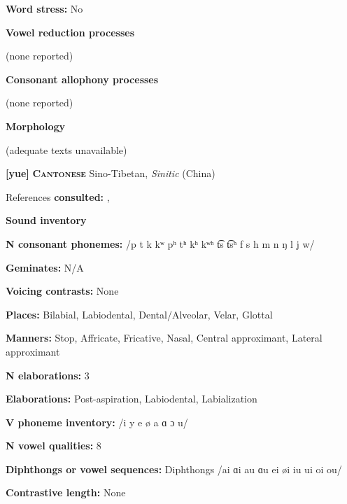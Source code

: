 \textbf{Word stress:} No



\textbf{Vowel reduction processes}



(none reported)



\textbf{Consonant allophony processes}



(none reported) 



\textbf{Morphology}



(adequate texts unavailable)



\textbf{[yue]}   \textbf{\textsc{Cantonese}}  Sino-Tibetan, \textit{Sinitic} (China)



References \textbf{consulted:} \citet{BauerBenedict1997}, \citet{MatthewsYip1994}



\textbf{Sound inventory}



\textbf{N consonant phonemes:} /p t k kʷ pʰ tʰ kʰ kʷʰ t͡s t͡sʰ f s h m n ŋ l j w/



\textbf{Geminates:} N/A



\textbf{Voicing contrasts:} None



\textbf{Places:} Bilabial, Labiodental, Dental/Alveolar, Velar, Glottal



\textbf{Manners:} Stop, Affricate, Fricative, Nasal, Central approximant, Lateral approximant



\textbf{N elaborations:} 3



\textbf{Elaborations:} Post-aspiration, Labiodental, Labialization



\textbf{V phoneme inventory:} /i y e ø a ɑ ɔ u/



\textbf{N vowel qualities:} 8



\textbf{Diphthongs or vowel sequences:} Diphthongs /ai ɑi au ɑu ei øi iu ui oi ou/



\textbf{Contrastive length:} None



